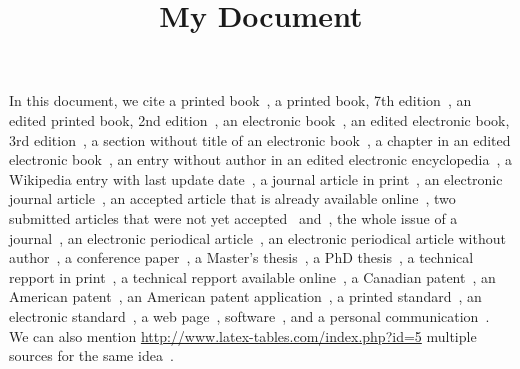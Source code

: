 \title{My Document}
\maketitle

In this document, we cite a printed book~\cite{Boyce2002}, a printed book, 7th edition~\cite{Brydson1999}, an edited printed book, 2nd edition~\cite{Fraas2010}, an electronic book~\cite{Manasreh2011}, an edited electronic book, 3rd edition~\cite{Chen2009}, a section without title of an electronic book~\cite{Kizza2013}, a chapter in an edited electronic book~\cite{Haist2014}, an entry without author in an edited electronic encyclopedia~\cite{Daintith2010}, a Wikipedia entry with last update date~\cite{Corrosion2015}, a journal article in print~\cite{Kaliouby1987}, an electronic journal article~\cite{Senjian2015}, an accepted article that is already available online~\cite{Choy2016}, two submitted articles that were not yet accepted~\cite{Choy2015} and~\cite{Choy2015a}, the whole issue of a journal~\cite{IEEE2012}, an electronic periodical article~\cite{Gervais2013}, an electronic periodical article without author~\cite{Ledevoir2013}, a conference paper~\cite{Madani2010}, a Master's thesis~\cite{Massicotte2013}, a PhD thesis~\cite{Rossi2011}, a technical repport in print~\cite{DeSantis2002}, a technical repport available online~\cite{Cohen2006}, a Canadian patent~\cite{Thorsson2014}, an American patent~\cite{Schirmer2012}, an American patent application~\cite{Sakai2015}, a printed standard~\cite{CSA2002}, an electronic standard~\cite{Electrical2006}, a web page~\cite{Ordre2015}, software~\cite{Druide2012}, and a personal communication~\cite{Com2015}. \\
We can also mention \url{http://www.latex-tables.com/index.php?id=5} multiple sources for the same idea~\cite{Kaliouby1987,Thorsson2014,Sakai2015}. %







